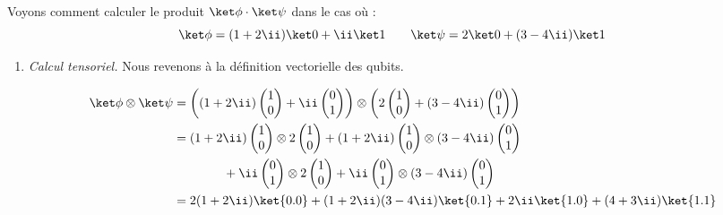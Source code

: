 \documentclass[11pt,class=report,crop=false]{standalone}
\begin{document}
\begin{exemple}
Voyons comment calculer le produit $\ket\phi \cdot \ket\psi$ dans le cas où :
$$\ket\phi = (1+2\ii)\ket0 + \ii\ket1\qquad
\ket\psi = 2\ket0 + (3-4\ii)\ket1$$

\begin{enumerate}
  \item \emph{Calcul tensoriel.} Nous revenons à la définition vectorielle des qubits.
  
\begin{align*}
\ket \phi \otimes \ket \psi
  &= \left((1+2\ii)\begin{pmatrix}1\\0\end{pmatrix} + \ii\begin{pmatrix}0\\1\end{pmatrix}\right) \otimes \left(2\begin{pmatrix}1\\0\end{pmatrix} + (3-4\ii)\begin{pmatrix}0\\1\end{pmatrix}\right)  \\
  &=  (1+2\ii)\begin{pmatrix}1\\0\end{pmatrix} \otimes 2\begin{pmatrix}1\\0\end{pmatrix} 
  + (1+2\ii)\begin{pmatrix}1\\0\end{pmatrix} \otimes (3-4\ii)\begin{pmatrix}0\\1\end{pmatrix} \\
  &\qquad \qquad + \ii\begin{pmatrix}0\\1\end{pmatrix} \otimes 2\begin{pmatrix}1\\0\end{pmatrix} 
  + \ii\begin{pmatrix}0\\1\end{pmatrix} \otimes   (3-4\ii)\begin{pmatrix}0\\1\end{pmatrix} \\
  &= 2(1+2\ii) \ket{0.0} + (1+2\ii)(3-4\ii)\ket{0.1} + 2\ii\ket{1.0}+ (4+3\ii)\ket{1.1} \\
\end{align*}
  

\end{enumerate}
\end{exemple}
\end{document}
